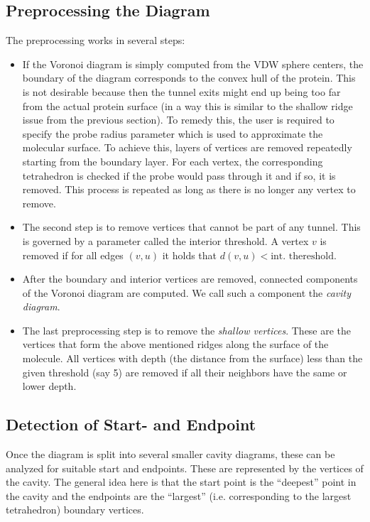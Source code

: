 \documentclass[11pt]{article} %
\begin{document}

\subsection{Preprocessing the Diagram}

The preprocessing works in several steps:

\begin{itemize}
\item If the Voronoi diagram is simply computed from the VDW sphere centers, the boundary of the diagram corresponds to the convex hull of the protein. This is not desirable because then the tunnel exits might end up being too far from the actual protein surface (in a way this is similar to the shallow ridge issue from the previous section). To remedy this, the user is required to specify the probe radius parameter which is used to approximate the molecular surface. To achieve this, layers of vertices are removed repeatedly starting from the boundary layer. For each vertex, the corresponding tetrahedron is checked if the probe would pass through it  and if so, it is removed. This process is repeated as long as there is no longer any vertex to remove.
\item The second step is to remove vertices that cannot be part of any tunnel. This is governed by a parameter called the interior threshold. A vertex $v$ is removed if for all edges $(v, u)$ it holds that $d(v, u) < \textrm{int. thereshold}$.
\item After the boundary and interior vertices are removed, connected components of the Voronoi diagram are computed. We call such a component the \textit{cavity diagram}. 
\item The last preprocessing step is to remove the \textit{shallow vertices}. These are the vertices that form the above mentioned ridges along the surface of the molecule. All vertices with depth (the distance from the surface) less than the given threshold (say 5) are removed if all their neighbors have the same or lower depth.
\end{itemize}

\subsection{Detection of Start- and Endpoint}

Once the diagram is split into several smaller cavity diagrams, these can be analyzed for suitable start and endpoints. These are represented by the vertices of the cavity. The general idea here is that the start point is the ``deepest'' point in the cavity and the endpoints are the ``largest'' (i.e. corresponding to the largest tetrahedron) boundary vertices.
\end{document}
